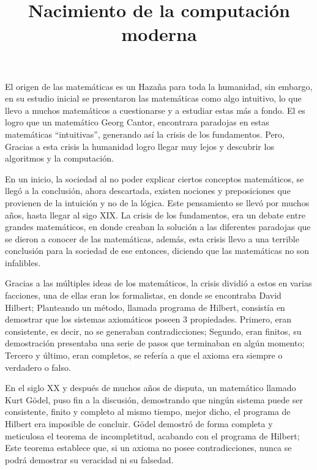 \documentclass{article}
\title{Nacimiento de la computación moderna}
\date{}
\author{}
\begin{document}
\maketitle

El origen de las matemáticas es un Hazaña para toda la humanidad, sin embargo, en su estudio inicial se presentaron las matemáticas como algo intuitivo, lo que llevo a muchos matemáticos a cuestionarse y a estudiar estas más a fondo. El es logro que un matemático Georg Cantor, encontrara paradojas en estas matemáticas “intuitivas”, generando así la crisis de los fundamentos. Pero, Gracias a esta crisis la humanidad logro llegar muy lejos y descubrir los algoritmos y la computación.

En un inicio, la sociedad al no poder explicar ciertos conceptos matemáticos, se llegó a la conclusión, ahora descartada, existen nociones y preposiciones que provienen de la intuición y no de la lógica. Este pensamiento se llevó por muchos años, hasta llegar al sigo XIX. La crisis de los fundamentos, era un debate entre grandes matemáticos, en donde creaban la solución a las diferentes paradojas que se dieron a conocer de las matemáticas, además, esta crisis llevo a una terrible conclusión para la sociedad de ese entonces, diciendo que las matemáticas no son infalibles.

Gracias a las múltiples ideas de los matemáticos, la crisis dividió a estos en varias facciones, una de ellas eran los formalistas, en donde se encontraba David Hilbert; Planteando un método, llamada programa de Hilbert, consistía en demostrar que los sistemas axiomáticos poseen 3 propiedades. Primero, eran consistente, es decir, no se generaban contradicciones; Segundo, eran finitos, su demostración presentaba una serie de pasos que terminaban en algún momento; Tercero y último, eran completos, se refería a que el axioma era siempre o verdadero o falso.

En el siglo XX y después de muchos años de disputa, un matemático llamado Kurt Gödel, puso fin a la discusión, demostrando que ningún sistema puede ser consistente, finito y completo al mismo tiempo, mejor dicho, el programa de Hilbert era imposible de concluir. Gödel demostró de forma completa y meticulosa el teorema de incompletitud, acabando con el programa de Hilbert; Este teorema establece que, si un axioma no posee contradicciones, nunca se podrá demostrar su veracidad ni su falsedad.
\end{document}
